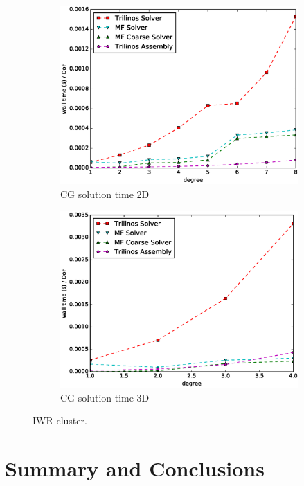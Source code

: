 \documentclass[preprint,12pt,times]{elsarticle}
\begin{document}
\begin{figure}[!ht]
\begin{subfigure}[b]{0.45\textwidth}
    \includegraphics[width=\textwidth]{IWR_solver2d.eps}
    \caption{CG solution time 2D}
    \label{fig:benchmark_miehe_IWR_sol2}
  \end{subfigure}
  \begin{subfigure}[b]{0.45\textwidth}
    \centering
    \includegraphics[width=\textwidth]{IWR_solver3d.eps}
    \caption{CG solution time 3D}
    \label{fig:benchmark_miehe_IWR_sol3}
  \end{subfigure}
  \caption{IWR cluster.}%
  \label{fig:benchmark_miehe_IWR}
\end{figure}


\section{Summary and Conclusions}
\label{sec:summary}
\end{document}
